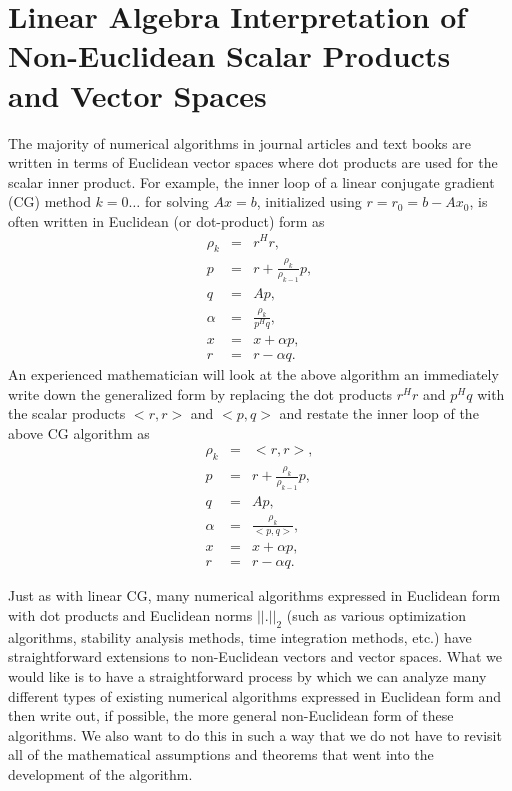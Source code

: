 \section{Linear Algebra Interpretation of Non-Euclidean Scalar Products and Vector Spaces}

The majority of numerical algorithms in journal articles and text books are
written in terms of Euclidean vector spaces where dot products are used for
the scalar inner product.  For example, the inner loop of a linear conjugate
gradient (CG) method $k=0\ldots{}$ for solving $A x = b$, initialized using $r
= r_0 = b - A x_0$, is often written in Euclidean (or dot-product) form as
%
\begin{eqnarray*}
\rho_k & = & r^H r, \\
p & = & r + \frac{\rho_k}{\rho_{k-1}} p, \\
q & = & A p, \\
\alpha & = & \frac{\rho_k}{p^H q}, \\
x & = & x + \alpha p, \\
r & = & r - \alpha q.
\end{eqnarray*}
%
An experienced mathematician will look at the above algorithm an immediately
write down the generalized form by replacing the dot products $r^H r$ and $p^H
q$ with the scalar products $<r,r>$ and $<p,q>$ and restate the inner loop of
the above CG algorithm as
%
\begin{eqnarray*}
\rho_k & = & <r,r>, \\
p & = & r + \frac{\rho_k}{\rho_{k-1}} p, \\
q & = & A p, \\
\alpha & = & \frac{\rho_k}{<p,q>}, \\
x & = & x + \alpha p, \\
r & = & r - \alpha q.
\end{eqnarray*}
%

Just as with linear CG, many numerical algorithms expressed in Euclidean form
with dot products and Euclidean norms $||.||_2$ (such as various optimization
algorithms, stability analysis methods, time integration methods, etc.) have
straightforward extensions to non-Euclidean vectors and vector spaces.  What we
would like is to have a straightforward process by which we can analyze many
different types of existing numerical algorithms expressed in Euclidean form
and then write out, if possible, the more general non-Euclidean form of these
algorithms.  We also want to do this in such a way that we do not have to
revisit all of the mathematical assumptions and theorems that went into the
development of the algorithm.

